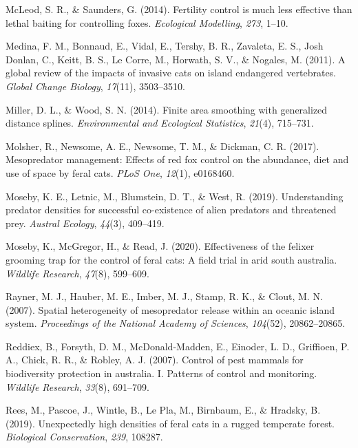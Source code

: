 \documentclass[]{elsarticle} %
\begin{document}
\leavevmode\hypertarget{ref-mcleod2014}{}%
McLeod, S. R., \& Saunders, G. (2014). Fertility control is much less effective than lethal baiting for controlling foxes. \emph{Ecological Modelling}, \emph{273}, 1--10.

\leavevmode\hypertarget{ref-medina2011}{}%
Medina, F. M., Bonnaud, E., Vidal, E., Tershy, B. R., Zavaleta, E. S., Josh Donlan, C., Keitt, B. S., Le Corre, M., Horwath, S. V., \& Nogales, M. (2011). A global review of the impacts of invasive cats on island endangered vertebrates. \emph{Global Change Biology}, \emph{17}(11), 3503--3510.

\leavevmode\hypertarget{ref-miller2014}{}%
Miller, D. L., \& Wood, S. N. (2014). Finite area smoothing with generalized distance splines. \emph{Environmental and Ecological Statistics}, \emph{21}(4), 715--731.

\leavevmode\hypertarget{ref-molsher2017}{}%
Molsher, R., Newsome, A. E., Newsome, T. M., \& Dickman, C. R. (2017). Mesopredator management: Effects of red fox control on the abundance, diet and use of space by feral cats. \emph{PLoS One}, \emph{12}(1), e0168460.

\leavevmode\hypertarget{ref-moseby2019}{}%
Moseby, K. E., Letnic, M., Blumstein, D. T., \& West, R. (2019). Understanding predator densities for successful co-existence of alien predators and threatened prey. \emph{Austral Ecology}, \emph{44}(3), 409--419.

\leavevmode\hypertarget{ref-moseby2020effectiveness}{}%
Moseby, K., McGregor, H., \& Read, J. (2020). Effectiveness of the felixer grooming trap for the control of feral cats: A field trial in arid south australia. \emph{Wildlife Research}, \emph{47}(8), 599--609.

\leavevmode\hypertarget{ref-rayner2007}{}%
Rayner, M. J., Hauber, M. E., Imber, M. J., Stamp, R. K., \& Clout, M. N. (2007). Spatial heterogeneity of mesopredator release within an oceanic island system. \emph{Proceedings of the National Academy of Sciences}, \emph{104}(52), 20862--20865.

\leavevmode\hypertarget{ref-reddiex2007}{}%
Reddiex, B., Forsyth, D. M., McDonald-Madden, E., Einoder, L. D., Griffioen, P. A., Chick, R. R., \& Robley, A. J. (2007). Control of pest mammals for biodiversity protection in australia. I. Patterns of control and monitoring. \emph{Wildlife Research}, \emph{33}(8), 691--709.

\leavevmode\hypertarget{ref-rees2019}{}%
Rees, M., Pascoe, J., Wintle, B., Le Pla, M., Birnbaum, E., \& Hradsky, B. (2019). Unexpectedly high densities of feral cats in a rugged temperate forest. \emph{Biological Conservation}, \emph{239}, 108287.
\end{document}
